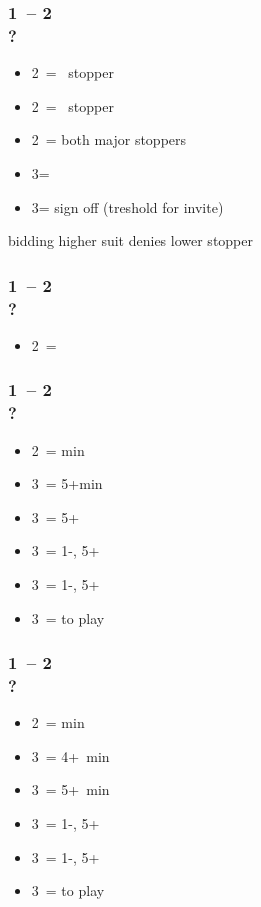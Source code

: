 \documentclass[12pt, a4paper]{article}
\begin{document}
\subsubsection*{1\diams\ -- 2\diams \\ ?}
\begin{itemize}
    \item 2\hearts\ = \hearts\ stopper
    \item 2\spades\ = \spades\ stopper
    \item 2\nt\ = both major stoppers
    \item 3\clubs = \nat
    \item 3\diams = sign off (treshold for invite)
\end{itemize}

bidding higher suit denies lower stopper

\subsubsection*{1\minor\ -- 2\hearts \\ ?}
\begin{itemize}
    \item 2\nt\ = \lsf \vimp
\end{itemize}

\subsubsection*{1\clubs\ -- 2\spades \\ ?}
\begin{itemize}
    \item 2\nt\ = \bal min
    \item 3\clubs\ = 5+\clubs min
    \item 3\diams\ = 5+\clubs \gf
    \item 3\hearts\ = 1-\hearts, 5+\clubs\ \gf
    \item 3\spades\ = 1-\spades, 5+\clubs\ \gf
    \item 3\nt\ = to play
\end{itemize}

\subsubsection*{1\diams\ -- 2\spades \\ ?}
\begin{itemize}
    \item 2\nt\ = \bal min
    \item 3\clubs\ = 4+\clubs\ min
    \item 3\diams\ = 5+\diams\ min
    \item 3\hearts\ = 1-\hearts, 5+\diams\ \gf
    \item 3\spades\ = 1-\spades, 5+\diams\ \gf
    \item 3\nt\ = to play
\end{itemize}
\end{document}
